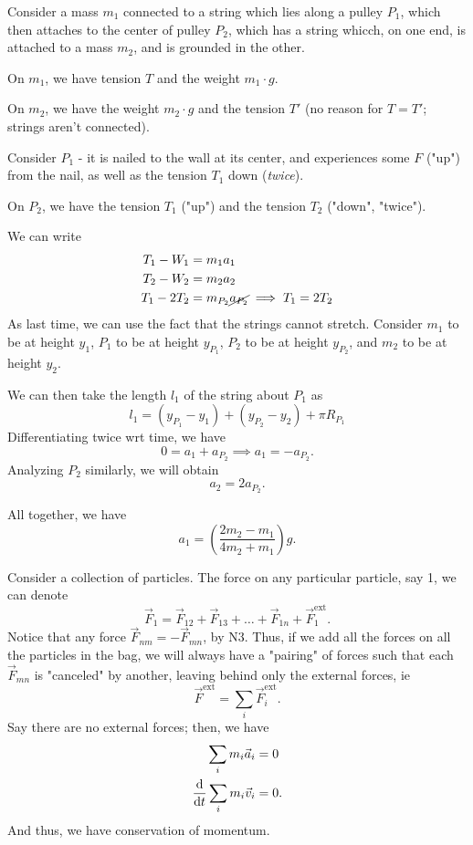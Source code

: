 \documentclass[12pt]{article}
\begin{document}
\begin{example}
  Consider a mass $m_1$ connected to a string which lies along a pulley $P_1$, which then attaches to the center of pulley $P_2$, which has a string whicch, on one end, is attached to a mass $m_2$, and is grounded in the other.

  On $m_1$, we have tension $T$ and the weight $m_1 \cdot g$.
  
  On $m_2$, we have the weight $m_2 \cdot g$ and the tension $T'$ (no reason for $T = T'$; strings aren't connected).

  Consider $P_1$ - it is nailed to the wall at its center, and experiences some $F$ ("up") from the nail, as well as the tension $T_1$ down (\textit{twice}). 

  On $P_2$, we have the tension $T_1$ ("up") and the tension $T_2$ ("down", "twice").

  We can write \begin{align*}
    T_1 - W_1 &= m_1 a_1\\
    T_2 - W_2 &= m_2 a_2\\
    T_1 - 2T_2 &= m_{P_2} \cancel{a_{P_2}}\implies T_1 = 2 T_2
  \end{align*}
  As last time, we can use the fact that the strings cannot stretch. Consider $m_1$ to be at height $y_1$, $P_1$ to be at height $y_{P_1}$, $P_2$ to be at height $y_{P_2}$, and $m_2$ to be at height $y_{2}$.

  We can then take the length $l_1$ of the string about $P_1$ as
  \[
  l_1 = (y_{P_1} - y_1) + (y_{P_2}-y_2) + \pi R_{P_1} 
  \]
  Differentiating twice wrt time, we have
  \[
  0 = a_1 + a_{P_2} \implies a_1 = - a_{P_2}.
  \]
  Analyzing $P_2$ similarly, we will obtain
  \[
    a_2 = 2 a_{P_2}.
  \]

  All together, we have 
  \[
  a_1 = \left(\frac{2m_2 - m_1}{4m_2 + m_1}\right) g.
  \]
\end{example}

Consider a collection of particles. The force on any particular particle, say 1, we can denote \[\vec{F}_{1} = \vec{F}_{12} + \vec{F}_{13} + \dots + \vec{F}_{1n} + \vec{F}^{\text{ext}}_1.\] Notice that any force $\vec{F}_{nm} = - \vec{F}_{mn}$, by N3. Thus, if we add all the forces on all the particles in the bag, we will always have a "pairing" of forces such that each $\vec{F}_{mn}$ is "canceled" by another, leaving behind only the external forces, ie \[\vec{F}^{\text{ext}} = \sum_{i} \vec{F}^{\text{ext}}_{i}.\] Say there are no external forces; then, we have 
\begin{align*}
  \sum_i m_i \vec{a}_i &= 0\\
  \dv{t} \sum_i m_i \vec{v}_i &= 0.\\
\end{align*}
And thus, we have conservation of momentum.
\end{document}
